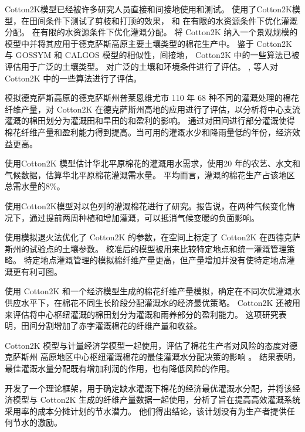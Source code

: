 Cotton2K模型已经被许多研究人员直接和间接地使用和测试。
 使用了Cotton2K模型，在田间条件下测试了剪枝和打顶的效果，
 和  在有限的水资源条件下优化灌溉分配。
在有限的水资源条件下优化灌溉分配。
 将 Cotton2K 纳入一个景观规模的模型中并将其应用于德克萨斯高原主要土壤类型的棉花生产中。
鉴于 Cotton2K 与 GOSSYM 和 CALGOS 模型的相似性，间接地， Cotton2K 中的一些算法已被评估用于广泛的土壤类型。
 对广泛的土壤和环境条件进行了评估。
,  等人对 Cotton2K 中的一些算法进行了评估。

 模拟德克萨斯高原的德克萨斯州普莱恩维尤市 110 年 68 种不同的灌溉处理的棉花纤维产量，对 Cotton2K 在德克萨斯州高地的应用进行了评估，以分析将中心支流灌溉的棉田划分为灌溉田和旱田的和盈利的影响。
通过对田间进行部分灌溉使得棉花纤维产量和盈利能力得到提高。当可用的灌溉水少和降雨量低的年份，经济效益更高。

 使用Cotton2K 模型估计华北平原棉花的灌溉用水需求，使用20 年的农艺、水文和气候数据，估算华北平原棉花灌溉需水量。
平均而言，灌溉的棉花生产占该地区总需水量的8\%。

 使用Cotton2K模型对以色列的灌溉棉花进行了研究。报告说，在两种气候变化情况下，通过提前两周种植和增加灌溉，可以抵消气候变暖的负面影响。

 使用模拟退火法优化了 Cotton2K 的参数，在空间上标定了 Cotton2K 在西德克萨斯州的试验点的土壤参数。
校准后的模型被用来比较特定地点和统一灌溉管理策略。
特定地点灌溉管理的模拟棉纤维产量更高，但产量增加并没有使特定地点灌溉更有利可图。

 使用 Cotton2K 和一个经济模型生成的棉花纤维产量模拟，确定在不同次优灌溉水供应水平下，在棉花不同生长阶段分配灌溉水的经济最优策略。
Cotton2K 还被用来评估将中心枢纽灌溉的棉田划分为灌溉和雨养部分的盈利能力\cite{nair2013}。
这项研究表明，田间分割增加了赤字灌溉棉花的纤维产量和收益。

Cotton2K 模型与计量经济学模型一起使用，评估了棉花生产者对风险的态度对德克萨斯州 高原地区中心枢纽灌溉棉花的最佳灌溉水分配决策的影响 \cite{nair2011}。
结果表明，最佳灌溉水量分配既有增加利润的作用，也有降低风险的作用。

 开发了一个理论框架，用于确定缺水灌溉下棉花的经济最优灌溉水分配，并将该经济模型与 Cotton2K 生成的纤维产量数据一起使用，分析了旨在提高高效灌溉系统采用率的成本分摊计划的节水潜力。
他们得出结论，该计划没有为生产者提供任何节水的激励。

